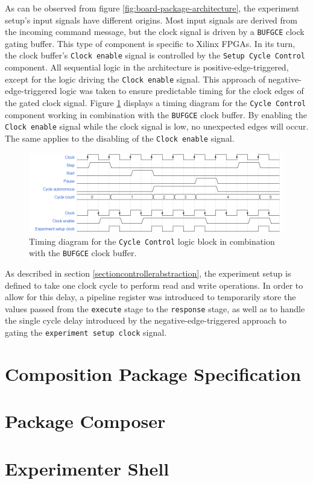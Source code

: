 \documentclass[main.tex]{subfiles}
\begin{document}
As can be observed from figure \ref{fig:board-package-architecture}, the experiment setup's input signals have different origins. Most input signals are derived from the incoming command message, but the clock signal is driven by a \texttt{BUFGCE} clock gating buffer. This type of component is specific to Xilinx FPGAs. In its turn, the clock buffer's \texttt{Clock enable} signal is controlled by the \texttt{Setup Cycle Control} component. All sequential logic in the architecture is positive-edge-triggered, except for the logic driving the \texttt{Clock enable} signal. This approach of negative-edge-triggered logic was taken to ensure predictable timing for the clock edges of the gated clock signal. Figure \ref{fig:timing-cycle-control} displays a timing diagram for the \texttt{Cycle Control} component working in combination with the \texttt{BUFGCE} clock buffer. By enabling the \texttt{Clock enable} signal while the clock signal is low, no unexpected edges will occur. The same applies to the disabling of the \texttt{Clock enable} signal. 

\begin{figure}[h]
\centering
\caption{Timing diagram for the \texttt{Cycle Control} logic block in combination with the \texttt{BUFGCE} clock buffer.}
\label{fig:timing-cycle-control}
\includegraphics[width=\textwidth]{img/cycle-control}
\end{figure}

As described in section \ref{sectioncontrollerabstraction}, the experiment setup is defined to take one clock cycle to perform read and write operations. In order to allow for this delay, a pipeline register was introduced to temporarily store the values passed from the \texttt{execute} stage to the \texttt{response} stage, as well as to handle the single cycle delay introduced by the negative-edge-triggered approach to gating the \texttt{experiment setup clock} signal.

\section{Composition Package Specification}



\section{Package Composer}



\section{Experimenter Shell}
\end{document}
